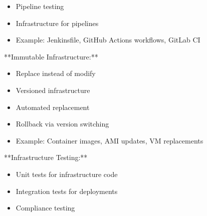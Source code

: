 \documentclass[11pt,a4paper]{article}
\begin{document}
\begin{itemize}
\item Pipeline testing
\end{itemize}

\begin{itemize}
\item Infrastructure for pipelines
\end{itemize}

\begin{itemize}
\item Example: Jenkinsfile, GitHub Actions workflows, GitLab CI
\end{itemize}

**Immutable Infrastructure:**

\begin{itemize}
\item Replace instead of modify
\end{itemize}

\begin{itemize}
\item Versioned infrastructure
\end{itemize}

\begin{itemize}
\item Automated replacement
\end{itemize}

\begin{itemize}
\item Rollback via version switching
\end{itemize}

\begin{itemize}
\item Example: Container images, AMI updates, VM replacements
\end{itemize}

**Infrastructure Testing:**

\begin{itemize}
\item Unit tests for infrastructure code
\end{itemize}

\begin{itemize}
\item Integration tests for deployments
\end{itemize}

\begin{itemize}
\item Compliance testing
\end{itemize}
\end{document}
